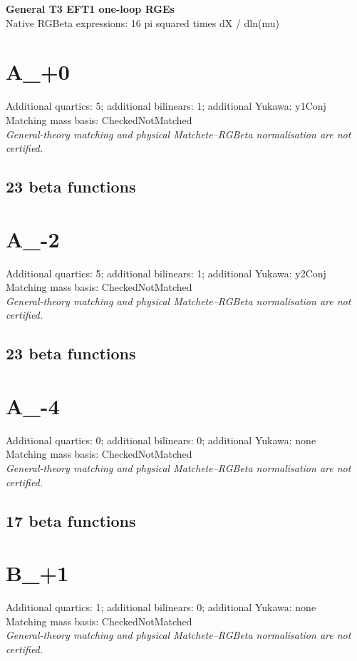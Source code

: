 \documentclass[10pt,a4paper]{article}
\begin{document}
\begin{center}
{\LARGE\bfseries General T3 EFT1 one-loop RGEs}\\[5pt]
Native RGBeta expressions: 16 pi squared times dX / dln(mu)
\end{center}
\tableofcontents
\clearpage
\clearpage
\section{A\_+0}
Additional quartics: 5; additional bilinears: 1; additional Yukawa: y1Conj\\
Matching mass basis: CheckedNotMatched\\
\emph{General-theory matching and physical Matchete--RGBeta normalisation are not certified.}
\subsection*{23 beta functions}

\clearpage
\section{A\_-2}
Additional quartics: 5; additional bilinears: 1; additional Yukawa: y2Conj\\
Matching mass basis: CheckedNotMatched\\
\emph{General-theory matching and physical Matchete--RGBeta normalisation are not certified.}
\subsection*{23 beta functions}

\clearpage
\section{A\_-4}
Additional quartics: 0; additional bilinears: 0; additional Yukawa: none\\
Matching mass basis: CheckedNotMatched\\
\emph{General-theory matching and physical Matchete--RGBeta normalisation are not certified.}
\subsection*{17 beta functions}

\clearpage
\section{B\_+1}
Additional quartics: 1; additional bilinears: 0; additional Yukawa: none\\
Matching mass basis: CheckedNotMatched\\
\emph{General-theory matching and physical Matchete--RGBeta normalisation are not certified.}
\end{document}
